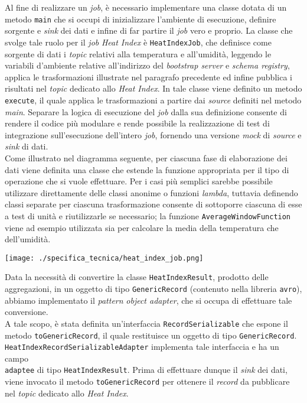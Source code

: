 Al fine di realizzare un \textit{job}, è necessario implementare una classe dotata di un metodo \texttt{main} che si occupi di inizializzare l'ambiente di esecuzione, definire
sorgente e \textit{sink} dei dati e infine di far partire il \textit{job} vero e proprio.
La classe che svolge tale ruolo per il \textit{job} \textit{Heat Index} è \texttt{HeatIndexJob}, che definisce come sorgente di dati
i \textit{topic} relativi alla temperatura e all'umidità, leggendo le variabili d'ambiente relative all'indirizzo del \textit{bootstrap server} e \textit{schema registry},
applica le trasformazioni illustrate nel paragrafo precedente ed infine pubblica i risultati nel \textit{topic} dedicato allo \textit{Heat Index}.
In tale classe viene definito un metodo \texttt{execute}, il quale applica le trasformazioni a partire dai \textit{source} definiti nel metodo \textit{main}. Separare
la logica di esecuzione del \textit{job} dalla sua definizione consente di rendere il codice più modulare e rende possibile la realizzazione di test di integrazione sull'esecuzione
dell'intero \textit{job}, fornendo una versione \textit{mock} di \textit{source} e \textit{sink} di dati.\\
Come illustrato nel diagramma seguente, per ciascuna fase di elaborazione dei dati viene definita una classe che estende la funzione appropriata per il tipo di operazione che si
vuole effettuare. Per i casi più semplici sarebbe possibile utilizzare direttamente delle classi anonime o funzioni \textit{lambda}, tuttavia definendo classi separate
per ciascuna trasformazione consente di sottoporre ciascuna di esse a test di unità e riutilizzarle se necessario; la funzione \texttt{AverageWindowFunction} viene ad esempio
utilizzata sia per calcolare la media della temperatura che dell'umidità.

\begin{center}
	\texttt{[image: ./specifica\_tecnica/heat\_index\_job.png]}
\end{center}

\label{object_adapter}
Data la necessità di convertire la classe \texttt{HeatIndexResult}, prodotto delle aggregazioni, in un oggetto di tipo \texttt{GenericRecord} (contenuto nella libreria \texttt{avro}),
abbiamo implementato il \textit{pattern} \textit{object adapter}, che si occupa di effettuare tale conversione.\\
A tale scopo, è stata definita un'interfaccia \texttt{RecordSerializable} che espone il metodo \texttt{toGenericRecord}, il quale restituisce un oggetto di tipo \texttt{GenericRecord}.\\
\texttt{HeatIndexRecordSerializableAdapter} implementa tale interfaccia e ha un campo \\\texttt{adaptee} di tipo \texttt{HeatIndexResult}. Prima di effettuare dunque il \textit{sink}
dei dati, viene invocato il metodo \texttt{toGenericRecord} per ottenere il \textit{record} da pubblicare nel \textit{topic} dedicato allo \textit{Heat Index}.

